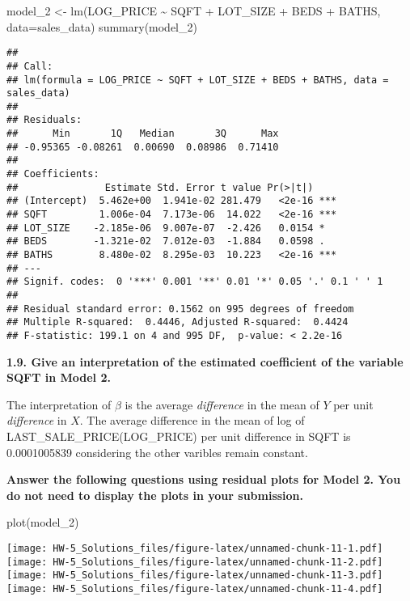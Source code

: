\documentclass[
]{article}
\newenvironment{Shaded}{\begin{snugshade}}{\end{snugshade}}
\newcommand{\AttributeTok}[1]{\textcolor[rgb]{0.77,0.63,0.00}{#1}}
\newcommand{\FunctionTok}[1]{\textcolor[rgb]{0.00,0.00,0.00}{#1}}
\newcommand{\NormalTok}[1]{#1}
\newcommand{\OtherTok}[1]{\textcolor[rgb]{0.56,0.35,0.01}{#1}}
\newcommand{\SpecialCharTok}[1]{\textcolor[rgb]{0.00,0.00,0.00}{#1}}
\begin{document}
\begin{Shaded}
\begin{Highlighting}[]
\NormalTok{model\_2 }\OtherTok{\textless{}{-}} \FunctionTok{lm}\NormalTok{(LOG\_PRICE }\SpecialCharTok{\textasciitilde{}}\NormalTok{ SQFT }\SpecialCharTok{+}\NormalTok{ LOT\_SIZE }\SpecialCharTok{+}\NormalTok{ BEDS }\SpecialCharTok{+}\NormalTok{ BATHS, }\AttributeTok{data=}\NormalTok{sales\_data)}
\FunctionTok{summary}\NormalTok{(model\_2)}
\end{Highlighting}
\end{Shaded}

\begin{verbatim}
## 
## Call:
## lm(formula = LOG_PRICE ~ SQFT + LOT_SIZE + BEDS + BATHS, data = sales_data)
## 
## Residuals:
##      Min       1Q   Median       3Q      Max 
## -0.95365 -0.08261  0.00690  0.08986  0.71410 
## 
## Coefficients:
##               Estimate Std. Error t value Pr(>|t|)    
## (Intercept)  5.462e+00  1.941e-02 281.479   <2e-16 ***
## SQFT         1.006e-04  7.173e-06  14.022   <2e-16 ***
## LOT_SIZE    -2.185e-06  9.007e-07  -2.426   0.0154 *  
## BEDS        -1.321e-02  7.012e-03  -1.884   0.0598 .  
## BATHS        8.480e-02  8.295e-03  10.223   <2e-16 ***
## ---
## Signif. codes:  0 '***' 0.001 '**' 0.01 '*' 0.05 '.' 0.1 ' ' 1
## 
## Residual standard error: 0.1562 on 995 degrees of freedom
## Multiple R-squared:  0.4446, Adjusted R-squared:  0.4424 
## F-statistic: 199.1 on 4 and 995 DF,  p-value: < 2.2e-16
\end{verbatim}

\textbf{1.9. Give an interpretation of the estimated coefficient of the
variable SQFT in Model 2. }

The interpretation of \(\beta\) is the average \emph{difference} in the
mean of \(Y\) per unit \emph{difference} in \(X\). The average
difference in the mean of log of LAST\_SALE\_PRICE(LOG\_PRICE) per unit
difference in SQFT is 0.0001005839 considering the other varibles remain
constant.

\textbf{Answer the following questions using residual plots for Model 2.
You do not need to display the plots in your submission.}

\begin{Shaded}
\begin{Highlighting}[]
\FunctionTok{plot}\NormalTok{(model\_2)}
\end{Highlighting}
\end{Shaded}

\texttt{[image: HW-5\_Solutions\_files/figure-latex/unnamed-chunk-11-1.pdf]}
\texttt{[image: HW-5\_Solutions\_files/figure-latex/unnamed-chunk-11-2.pdf]}
\texttt{[image: HW-5\_Solutions\_files/figure-latex/unnamed-chunk-11-3.pdf]}
\texttt{[image: HW-5\_Solutions\_files/figure-latex/unnamed-chunk-11-4.pdf]}
\end{document}
